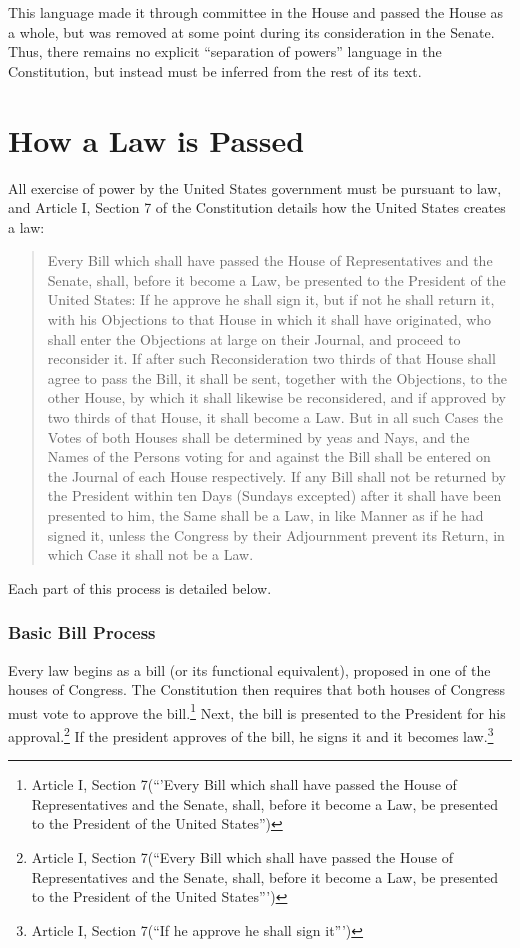 This language made it through committee in the House and passed the House as a whole, but was removed at some point during its consideration in the Senate.  Thus, there remains no explicit ``separation of powers'' language in the Constitution, but instead must be inferred from the rest of its text.

\section{How a Law is Passed}

All exercise of power by the United States government must be pursuant to law, and Article I, Section 7 of the Constitution details how the United States creates a law:

\begin{quote}
Every Bill which shall have passed the House of Representatives and the Senate, shall, before it become a Law, be presented to the President of the United States: If he approve he shall sign it, but if not he shall return it, with his Objections to that House in which it shall have originated, who shall enter the Objections at large on their Journal, and proceed to reconsider it. If after such Reconsideration two thirds of that House shall agree to pass the Bill, it shall be sent, together with the Objections, to the other House, by which it shall likewise be reconsidered, and if approved by two thirds of that House, it shall become a Law. But in all such Cases the Votes of both Houses shall be determined by yeas and Nays, and the Names of the Persons voting for and against the Bill shall be entered on the Journal of each House respectively. If any Bill shall not be returned by the President within ten Days (Sundays excepted) after it shall have been presented to him, the Same shall be a Law, in like Manner as if he had signed it, unless the Congress by their Adjournment prevent its Return, in which Case it shall not be a Law.
\end{quote}

Each part of this process is detailed below.

\subsubsection{Basic Bill Process}

Every law begins as a bill (or its functional equivalent), proposed in one of the houses of Congress.  The Constitution then requires that both houses of Congress must vote to approve the bill.\footnote{Article I, Section 7(``'Every Bill which shall have passed the House of Representatives and the Senate, shall, before it become a Law, be presented to the President of the United States'')}
Next, the bill is presented to the President for his approval.\footnote{Article I, Section 7(``Every Bill which shall have passed the House of Representatives and the Senate, shall, before it become a Law, be presented to the President of the United States''')}
If the president approves of the bill, he signs it and it becomes law.\footnote{Article I, Section 7(``If he approve he shall sign it''')}

